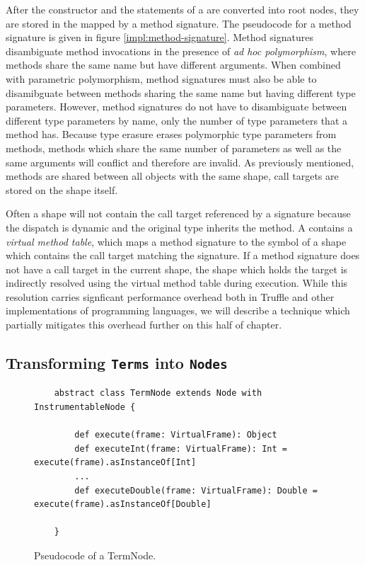 After the constructor and the  statements of a  are converted into root nodes, they are stored in the  mapped by a method signature.
The pseudocode for a method signature is given in figure \ref{impl:method-signature}.
Method signatures disambiguate method invocations in the presence of \textit{ad hoc polymorphism}\cite{strachey:fundamental-concepts}, where methods share the same name but have different arguments.
When combined with parametric polymorphism, method signatures must also be able to disamibguate between methods sharing the same name but having different type parameters.
However, method signatures do not have to disambiguate between different type parameters by name, only the number of type parameters that a method has.
Because type erasure erases polymorphic type parameters from methods, methods which share the same number of parameters as well as the same arguments will conflict and therefore are invalid.
As previously mentioned, methods are shared between all  objects with the same shape, call targets are stored on the shape itself.

Often a shape will not contain the call target referenced by a signature because the dispatch is dynamic and the original type inherits the method.
A  contains a \textit{virtual method table}, which maps a method signature to the symbol of a shape which contains the call target matching the signature.
If a method signature does not have a call target in the current shape, the shape which holds the target is indirectly resolved using the virtual method table during execution.
While this resolution carries signficant performance overhead both in Truffle and other implementations of programming languages, we will describe a technique which partially mitigates this overhead further on this half of chapter.

\subsection{Transforming \texttt{Terms} into \texttt{Nodes}}

\begin{figure}[!htb]
	\begin{verbatim}
	abstract class TermNode extends Node with InstrumentableNode {
	
		def execute(frame: VirtualFrame): Object 
		def executeInt(frame: VirtualFrame): Int = execute(frame).asInstanceOf[Int]
		...
		def executeDouble(frame: VirtualFrame): Double = execute(frame).asInstanceOf[Double]

	}
	\end{verbatim}
	\caption{Pseudocode of a TermNode.}
	\label{impl:term-node}
\end{figure}

